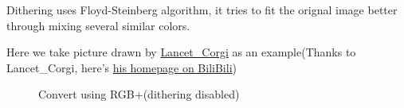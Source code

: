\documentclass{article}
\begin{document}
    Dithering uses Floyd-Steinberg algorithm, it tries to fit the orignal image better through mixing several similar colors.
    
    Here we take picture drawn by \href{https://t.bilibili.com/544583492149793294}{Lancet\_Corgi} as an example(Thanks to Lancet\_Corgi, here's \href{https://space.bilibili.com/37171000}{his homepage on BiliBili})
    
    \begin{figure}[htbp]
        \centering
        \setcounter{subfigure}{0}
        \caption{Convert using RGB+(dithering disabled)}
    \end{figure}
    
\end{document}
